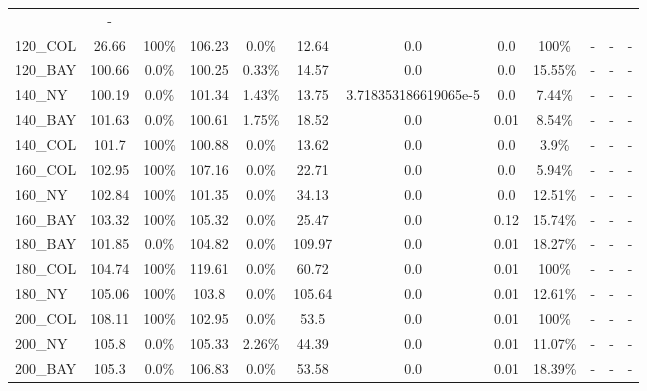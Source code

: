 \documentclass[main.tex]{subfiles}
\begin{document}
\begin{center}
\begin{tabular}{lccccccccccc}
 & - \\
120\_COL & 26.66 &  100\%  & 106.23 & 0.0\% & 12.64 & 0.0 & 0.0 &  100\%  & - & - 
 & - \\
120\_BAY & 100.66 & 0.0\% & 100.25 & 0.33\% & 14.57 & 0.0 & 0.0 & 15.55\% & - & - 
 & - \\
140\_NY & 100.19 & 0.0\% & 101.34 & 1.43\% & 13.75 & 3.718353186619065e-5 & 0.0 & 7.44\% & - & - 
 & - \\
140\_BAY & 101.63 & 0.0\% & 100.61 & 1.75\% & 18.52 & 0.0 & 0.01 & 8.54\% & - & - 
 & - \\
140\_COL & 101.7 &  100\%  & 100.88 & 0.0\% & 13.62 & 0.0 & 0.0 & 3.9\% & - & - 
 & - \\
160\_COL & 102.95 &  100\%  & 107.16 & 0.0\% & 22.71 & 0.0 & 0.0 & 5.94\% & - & - 
 & - \\
160\_NY & 102.84 &  100\%  & 101.35 & 0.0\% & 34.13 & 0.0 & 0.0 & 12.51\% & - & - 
 & - \\
160\_BAY & 103.32 &  100\%  & 105.32 & 0.0\% & 25.47 & 0.0 & 0.12 & 15.74\% & - & - 
 & - \\
180\_BAY & 101.85 & 0.0\% & 104.82 & 0.0\% & 109.97 & 0.0 & 0.01 & 18.27\% & - & - 
 & - \\
180\_COL & 104.74 &  100\%  & 119.61 & 0.0\% & 60.72 & 0.0 & 0.01 &  100\%  & - & - 
 & - \\
180\_NY & 105.06 &  100\%  & 103.8 & 0.0\% & 105.64 & 0.0 & 0.01 & 12.61\% & - & - 
 & - \\
200\_COL & 108.11 &  100\%  & 102.95 & 0.0\% & 53.5 & 0.0 & 0.01 &  100\%  & - & - 
 & - \\
200\_NY & 105.8 & 0.0\% & 105.33 & 2.26\% & 44.39 & 0.0 & 0.01 & 11.07\% & - & - 
 & - \\
200\_BAY & 105.3 & 0.0\% & 106.83 & 0.0\% & 53.58 & 0.0 & 0.01 & 18.39\% & - & - 
 & - \\
\hline\end{tabular}
\end{center}
\end{document}
